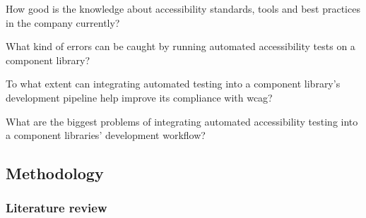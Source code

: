 \documentclass{master_thesis}
\begin{document}
	\begin{RQlist}
		\item How good is the knowledge about accessibility standards, tools and best practices in the company currently?
		\item What kind of errors can be caught by running automated accessibility tests on a component library?
		\item To what extent can integrating automated testing into a component library's development pipeline help improve its compliance with \ac{wcag}?
		\item What are the biggest problems of integrating automated accessibility testing into a component libraries' development workflow?
	\end{RQlist}

\subsection{Methodology}




\subsubsection{Literature review}
\end{document}
